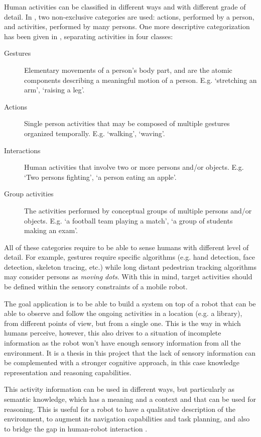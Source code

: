 Human activities can be classified in different ways and with different grade of detail.
In \citep{Turaga2008_MaRecHuAcSurv}, two non-exclusive categories are used: actions, performed by a person, and activities, performed by many persons.
One more descriptive categorization has been given in \citep{Aggarwal11_HumanActivity}, separating activities in four classes:

\begin{description}
\item[Gestures] Elementary movements of a person's body part, and are the atomic components describing a meaningful motion of a person. 
E.g. `stretching an arm', `raising a leg'.
\item[Actions] Single person activities that may be composed of multiple gestures organized temporally. 
E.g. `walking', `waving'.
\item[Interactions] Human activities that involve two or more persons and/or objects. 
E.g. `Two persons fighting', `a person eating an apple'.
\item[Group activities] The activities performed by conceptual groups of multiple persons and/or objects. 
E.g. `a football team playing a match', `a group of students making an exam'.
\end{description}

All of these categories require to be able to sense humans with different level of detail.
For example, gestures require specific algorithms (e.g. hand detection, face detection, skeleton tracing, etc.) while long distant pedestrian tracking algorithms may consider persons as \textit{moving dots}.
With this in mind, target activities should be defined within the sensory constraints of a mobile robot.

The goal application is to be able to build a system on top of a robot that can be able to observe and follow the ongoing activities in a location (e.g. a library), from different points of view, but from a single one. 
This is the way in which humans perceive, however, this also drives to a situation of incomplete information as the robot won't have enough sensory information from all the environment. 
It is a thesis in this project that the lack of sensory information can be complemented with a stronger cognitive approach, in this case knowledge representation and reasoning capabilities.

This activity information can be used in different ways, but particularly as semantic knowledge, which has a meaning and a context and that can be used for reasoning.
This is useful for a robot to have a qualitative description of the environment, to augment its navigation capabilities and task planning, and also to bridge the gap in human-robot interaction \citep{Kostavelis2015_SemMapSurv}.

